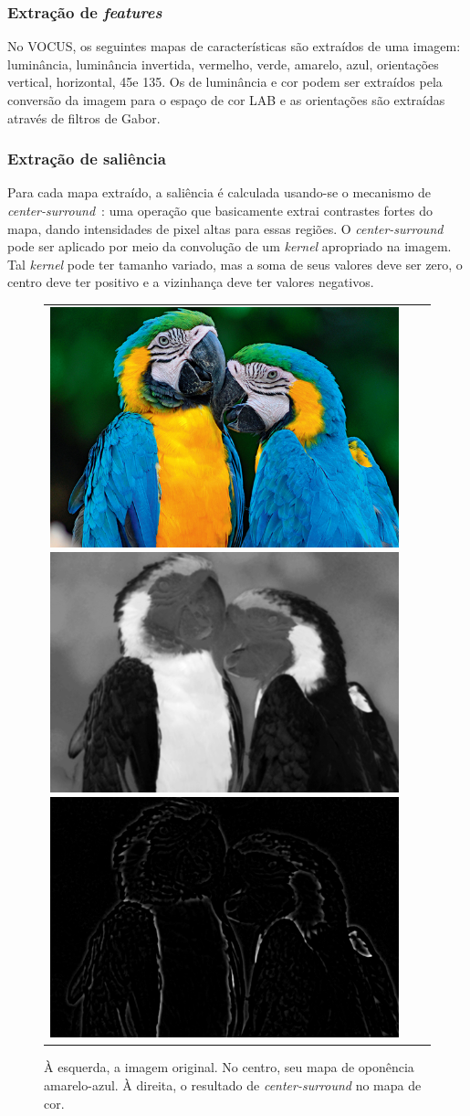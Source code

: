 \documentclass[11pt]{article}
\newcommand{\tit}[1]{\textit{#1}}
\begin{document}
\subsubsection{Extração de \tit{features}}
No VOCUS, os seguintes mapas de características são extraídos de uma imagem:
luminância, luminância invertida, vermelho, verde, amarelo, azul,
orientações vertical, horizontal, 45\degree e 135\degree.
Os de luminância e cor podem ser extraídos pela conversão da imagem para o
espaço de cor LAB e as orientações são extraídas através de filtros de Gabor.

\subsubsection{Extração de saliência}

Para cada mapa extraído, a saliência é calculada usando-se o mecanismo de
\tit{center-surround}~\cite{Frintrop2006}:
uma operação que basicamente extrai contrastes fortes
do mapa, dando intensidades de pixel altas para essas regiões.
O \tit{center-surround} pode ser aplicado por meio da convolução de um
\tit{kernel} apropriado na imagem.
Tal \tit{kernel} pode ter tamanho variado, mas a soma de seus valores deve
ser zero, o centro deve ter positivo e a vizinhança deve ter valores
negativos.
\begin{figure}[H]
\begin{center}
		\begin{tabular} {ccc}
            \includegraphics[width=0.3\linewidth]{img/arara.jpg}
            \includegraphics[width=0.3\linewidth]{img/arara_y.png}
            \includegraphics[width=0.3\linewidth]{img/arara_y_cs.png}
		\end{tabular}
\end{center}
\caption{À esquerda, a imagem original. No centro, seu mapa de oponência
amarelo-azul. À direita, o resultado de \tit{center-surround}
no mapa de cor.}
\label{fig:extrfeat}
\end{figure}
\end{document}
